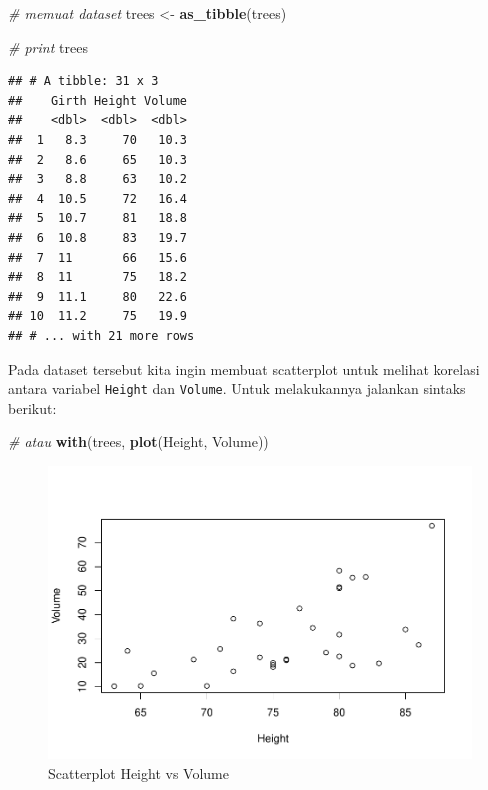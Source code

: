 \documentclass[]{book}
\newenvironment{Shaded}{\begin{snugshade}}{\end{snugshade}}
\newcommand{\KeywordTok}[1]{\textcolor[rgb]{0.13,0.29,0.53}{\textbf{#1}}}
\newcommand{\StringTok}[1]{\textcolor[rgb]{0.31,0.60,0.02}{#1}}
\newcommand{\CommentTok}[1]{\textcolor[rgb]{0.56,0.35,0.01}{\textit{#1}}}
\newcommand{\OperatorTok}[1]{\textcolor[rgb]{0.81,0.36,0.00}{\textbf{#1}}}
\newcommand{\NormalTok}[1]{#1}
\begin{document}
\begin{Shaded}
\begin{Highlighting}[]
\CommentTok{# memuat dataset}
\NormalTok{trees <-}\StringTok{ }\KeywordTok{as_tibble}\NormalTok{(trees)}

\CommentTok{# print }
\NormalTok{trees}
\end{Highlighting}
\end{Shaded}

\begin{verbatim}
## # A tibble: 31 x 3
##    Girth Height Volume
##    <dbl>  <dbl>  <dbl>
##  1   8.3     70   10.3
##  2   8.6     65   10.3
##  3   8.8     63   10.2
##  4  10.5     72   16.4
##  5  10.7     81   18.8
##  6  10.8     83   19.7
##  7  11       66   15.6
##  8  11       75   18.2
##  9  11.1     80   22.6
## 10  11.2     75   19.9
## # ... with 21 more rows
\end{verbatim}

Pada dataset tersebut kita ingin membuat scatterplot untuk melihat
korelasi antara variabel \texttt{Height} dan \texttt{Volume}. Untuk
melakukannya jalankan sintaks berikut:

\begin{Shaded}
\end{Shaded}

\begin{Shaded}
\begin{Highlighting}[]
\CommentTok{# atau }
\KeywordTok{with}\NormalTok{(trees, }\KeywordTok{plot}\NormalTok{(Height, Volume))}
\end{Highlighting}
\end{Shaded}

\begin{figure}

{\centering \includegraphics[width=0.7\linewidth]{EnvStat_files/figure-latex/scatter-1} 

}

\caption{Scatterplot Height vs Volume}\label{fig:scatter}
\end{figure}
\end{document}
